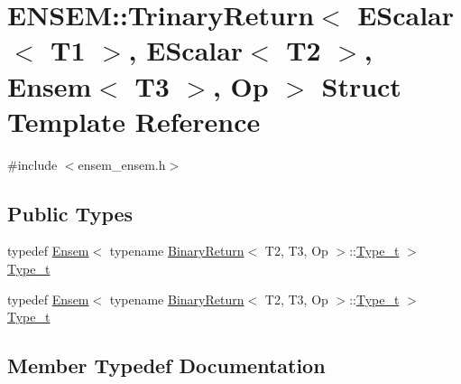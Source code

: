 \hypertarget{structENSEM_1_1TrinaryReturn_3_01EScalar_3_01T1_01_4_00_01EScalar_3_01T2_01_4_00_01Ensem_3_01T3_01_4_00_01Op_01_4}{}\section{E\+N\+S\+EM\+:\+:Trinary\+Return$<$ E\+Scalar$<$ T1 $>$, E\+Scalar$<$ T2 $>$, Ensem$<$ T3 $>$, Op $>$ Struct Template Reference}
\label{structENSEM_1_1TrinaryReturn_3_01EScalar_3_01T1_01_4_00_01EScalar_3_01T2_01_4_00_01Ensem_3_01T3_01_4_00_01Op_01_4}


{\ttfamily \#include $<$ensem\+\_\+ensem.\+h$>$}

\subsection*{Public Types}
\begin{DoxyCompactItemize}
\item 
typedef \mbox{\hyperlink{classENSEM_1_1Ensem}{Ensem}}$<$ typename \mbox{\hyperlink{structENSEM_1_1BinaryReturn}{Binary\+Return}}$<$ T2, T3, Op $>$\+::\mbox{\hyperlink{structENSEM_1_1TrinaryReturn_3_01EScalar_3_01T1_01_4_00_01EScalar_3_01T2_01_4_00_01Ensem_3_01T3_01_4_00_01Op_01_4_ae31d88575287f33c17235b01284dba5e}{Type\+\_\+t}} $>$ \mbox{\hyperlink{structENSEM_1_1TrinaryReturn_3_01EScalar_3_01T1_01_4_00_01EScalar_3_01T2_01_4_00_01Ensem_3_01T3_01_4_00_01Op_01_4_ae31d88575287f33c17235b01284dba5e}{Type\+\_\+t}}
\item 
typedef \mbox{\hyperlink{classENSEM_1_1Ensem}{Ensem}}$<$ typename \mbox{\hyperlink{structENSEM_1_1BinaryReturn}{Binary\+Return}}$<$ T2, T3, Op $>$\+::\mbox{\hyperlink{structENSEM_1_1TrinaryReturn_3_01EScalar_3_01T1_01_4_00_01EScalar_3_01T2_01_4_00_01Ensem_3_01T3_01_4_00_01Op_01_4_ae31d88575287f33c17235b01284dba5e}{Type\+\_\+t}} $>$ \mbox{\hyperlink{structENSEM_1_1TrinaryReturn_3_01EScalar_3_01T1_01_4_00_01EScalar_3_01T2_01_4_00_01Ensem_3_01T3_01_4_00_01Op_01_4_ae31d88575287f33c17235b01284dba5e}{Type\+\_\+t}}
\end{DoxyCompactItemize}


\subsection{Member Typedef Documentation}
\mbox{\label{structENSEM_1_1TrinaryReturn_3_01EScalar_3_01T1_01_4_00_01EScalar_3_01T2_01_4_00_01Ensem_3_01T3_01_4_00_01Op_01_4_ae31d88575287f33c17235b01284dba5e}} 
